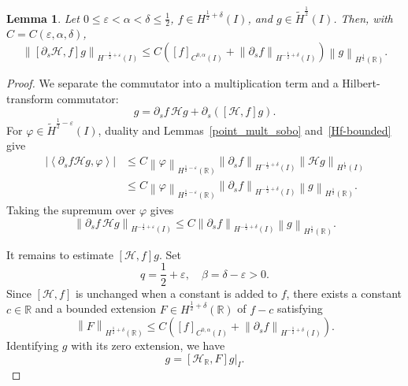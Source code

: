 \documentclass[11pt,reqno]{amsart}
\theoremstyle{plain}
\newtheorem{lemma}[theorem]{Lemma}
\theoremstyle{definition}
\numberwithin{equation}{section}
\newcommand{\paren}[1]{\left(#1\right)}
\newcommand{\p}{\partial}
\newcommand{\mc}[1]{\mathcal{#1}}
\newcommand{\wt}[1]{\widetilde{#1}}
\newcommand{\abs}[1]{\left\lvert #1 \right\rvert}
\newcommand{\norm}[1]{\left\lVert #1 \right\rVert}
\newcommand{\dual}[2]{\left\langle #1,#2 \right\rangle}
\newcommand{\vph}{\varphi}
\newcommand{\R}{\mathbb{R}}
\newcommand{\ci}[1]{C^{#1}(I)}
\newcommand{\hi}[1]{H^{#1}(I)}
\newcommand{\thi}[1]{\wt H^{#1}(I)}
\newcommand{\hr}[1]{H^{#1}(\R)}
\begin{document}
\begin{lemma}\label{dsH_f_comm}
Let $0\le\varepsilon<\alpha<\delta\le\frac12$,
$f\in H^{\frac12+\delta}(I)$, and $g\in\wt H^{\frac12}(I)$. Then, with
$C=C(\varepsilon,\alpha,\delta)$,
\begin{equation}\label{eqn:commutator-low-bound}
    \norm{[\p_s\mc H,f]g}_{\hi{-\frac12+\varepsilon}}
    \le C\paren{[f]_{\ci{0,\alpha}}
    +\norm{\p_s f}_{\hi{-\frac12+\delta}}}
    \norm{g}_{H^{\frac12}(\R)}.
\end{equation}
\end{lemma}
\begin{proof}
We separate the commutator into a multiplication term and a Hilbert-transform
commutator:
\begin{equation}
    [\p_s\mc H,f]g
    =\p_s f\,\mc Hg+\p_s\paren{[\mc H,f]g}.
\end{equation}
For $\vph\in\thi{\frac12-\varepsilon}$, duality and
Lemmas~\ref{point_mult_sobo} and~\ref{Hf-bounded} give
\begin{equation}
\begin{aligned}
    \abs{\dual{\p_s f\mc H g}{\vph}}
    &\le C\norm{\vph}_{H^{\frac12-\varepsilon}(\R)}
    \norm{\p_s f}_{\hi{-\frac12+\delta}}
    \norm{\mc Hg}_{H^{\frac12}(I)} \\
    &\le C\norm{\vph}_{H^{\frac12-\varepsilon}(\R)}
    \norm{\p_s f}_{\hi{-\frac12+\delta}}
    \norm{g}_{H^{\frac12}(\R)}.
\end{aligned}
\end{equation}
Taking the supremum over $\vph$ gives
\begin{equation}\label{eqn:dsHf1}
    \norm{\p_s f\,\mc Hg}_{\hi{-\frac12+\varepsilon}}
    \le C\norm{\p_s f}_{\hi{-\frac12+\delta}}
    \norm{g}_{H^{\frac12}(\R)}.
\end{equation}

It remains to estimate $[\mc H,f]g$. Set
\begin{equation}
    q=\frac12+\varepsilon,\quad \beta=\delta-\varepsilon>0.
\end{equation}
Since $[\mc H,f]$ is unchanged when a constant is added to $f$, there exists a constant $c\in\R$ and a bounded extension
$F\in\hr{\frac12+\delta}$ of $f-c$ satisfying
\begin{equation}
    \norm{F}_{\hr{\frac12+\delta}}
    \le C\paren{[f]_{\ci{0,\alpha}}
    +\norm{\p_s f}_{\hi{-\frac12+\delta}}}.
\end{equation}
Identifying $g$ with its zero extension, we have
\begin{equation}
    [\mc H,f]g=\left.[\mc H_{\R},F]g\right|_I.
\end{equation}


\end{proof}
\end{document}
